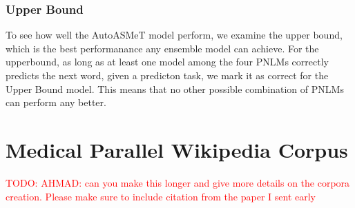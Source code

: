 \documentclass[11pt]{article}
\newcommand{\todo}[1]{\textcolor{red}{TODO: #1}}
\begin{document}
\subsubsection{Upper Bound}

To see how well the AutoASMeT model perform, we examine the upper bound, which is the best performanance any ensemble model can achieve. For the upperbound, as long as at least one model among the four PNLMs correctly predicts the next word, given a predicton task, we mark it as correct for the Upper Bound model. This means that no other possible combination of PNLMs can perform any better.

\section{Medical Parallel Wikipedia Corpus} \label{sec:medical_corpora}
\todo{AHMAD: can you make this longer and give more details on the corpora creation. Please make sure to include citation from the paper I sent early}
\end{document}
